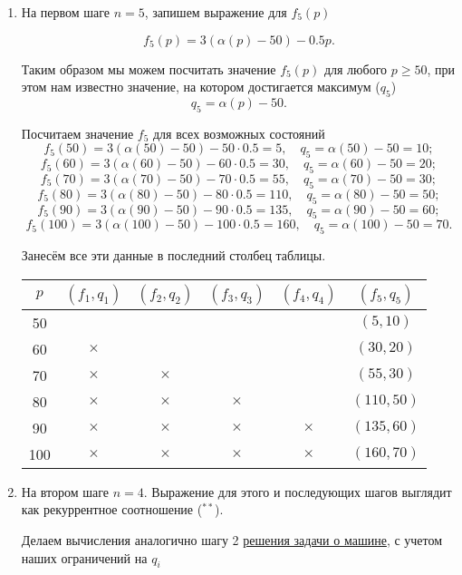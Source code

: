 \begin{enumerate}
	\item[\fbox{\textbf{Шаг 1}}] На первом шаге $n = 5$, запишем выражение для $f_5(p)$
	
	\[
	f_5(p) = 3(\alpha(p) - 50) - 0.5p.
	\]
	
	Таким образом мы можем посчитать значение $f_5(p)$ для любого $p \ge 50$, при этом нам известно значение, на котором достигается максимум ($q_5$)
	\[
	q_5 = \alpha(p) - 50.
	\]
	
	Посчитаем значение $f_5$ для всех возможных состояний
	\[
	f_5(50) = 3(\alpha(50) - 50) - 50\cdot0.5 = 5, \quad q_5 = \alpha(50) - 50 = 10;
	\]
	\[
	f_5(60) = 3(\alpha(60) - 50) - 60\cdot0.5 = 30, \quad q_5 = \alpha(60) - 50 = 20;
	\]
	\[
	f_5(70) = 3(\alpha(70) - 50) - 70\cdot0.5 = 55, \quad q_5 = \alpha(70) - 50 = 30;
	\]
	\[
	f_5(80) = 3(\alpha(80) - 50) - 80\cdot0.5 = 110, \quad q_5 = \alpha(80) - 50 = 50;
	\]
	\[
	f_5(90) = 3(\alpha(90) - 50) - 90\cdot0.5 = 135, \quad q_5 = \alpha(90) - 50 = 60;
	\]
	\[
	f_5(100) = 3(\alpha(100) - 50) - 100\cdot0.5 = 160, \quad q_5 = \alpha(100) - 50 = 70.
	\]
	
	Занесём все эти данные в последний столбец таблицы.
	
	\begin{table}[H]
		\centering
		\begin{tabular}{ | c | c | c | c | c | c | } 
			\hline
			$p$ & $(f_1, q_1)$ & $(f_2, q_2)$ & $(f_3, q_3)$ & $(f_4, q_4)$ & $(f_5, q_5)$ \\ 
			\hline
			50 & & & & & $(5, 10)$ \\\hline
			60 & $\times$ & & & & $(30, 20)$ \\\hline
			70 & $\times$ & $\times$ & & & $(55, 30)$ \\\hline
			80 & $\times$ & $\times$ & $\times$ & & $(110, 50)$ \\\hline
			90 & $\times$ & $\times$ & $\times$ & $\times$ & $(135, 60)$ \\\hline
			100 & $\times$ & $\times$ & $\times$ & $\times$ & $(160, 70)$ \\\hline
		\end{tabular}
	\end{table}
		
	\item[\fbox{\textbf{Шаг 2}}] 
	На втором шаге $n = 4$. Выражение для этого и последующих шагов выглядит как рекуррентное соотношение ($^{**}$).
	
	Делаем вычисления аналогично шагу 2 \hyperref[pr:car_on_island]{решения задачи о машине}, с учетом наших ограничений на $q_i$
	

\end{enumerate}
